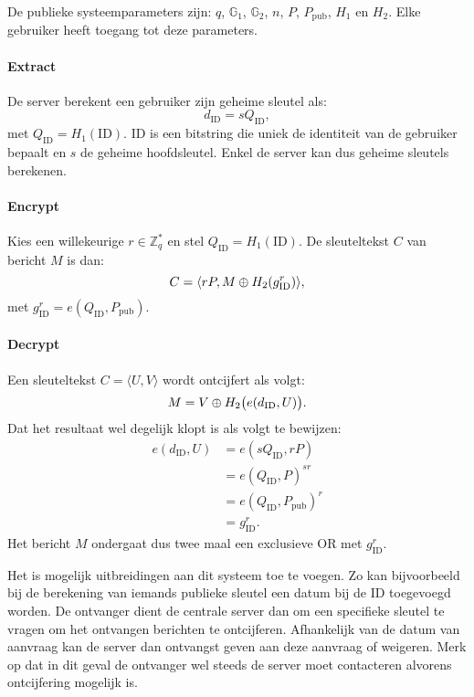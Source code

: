De publieke systeemparameters zijn: $q$, $\mathbb{G}_1$, $\mathbb{G}_2$, $n$, $P$, $P_{\text{pub}}$, $H_1$ en $H_2$. Elke gebruiker heeft toegang tot deze parameters.

\paragraph{Extract} De server berekent een gebruiker zijn geheime sleutel als:
\[d_{\text{ID}} = s Q_{\text{ID}},\]
met $Q_{\text{ID}} = H_1(\text{ID})$. ID is een bitstring die uniek de identiteit van de gebruiker bepaalt en $s$ de geheime hoofdsleutel. Enkel de server kan dus geheime sleutels berekenen.

\paragraph{Encrypt} Kies een willekeurige $r \in \mathbb{Z}_q^*$ en stel $Q_{\text{ID}} = H_1(\text{ID})$. De sleuteltekst $C$ van bericht $M$ is dan:
\[C = \langle rP, M \oplus H_2(g_{\text{ID}}^r) \rangle,\]
met $g_{\text{ID}}^r = e(Q_{\text{ID}}, P_{\text{pub}})$.

\paragraph{Decrypt} Een sleuteltekst $C = \langle U, V \rangle$ wordt ontcijfert als volgt:
\[M = V \oplus H_2\big( e(d_{\text{ID}}, U) \big).\]
Dat het resultaat wel degelijk klopt is als volgt te bewijzen:
\[\begin{aligned}
e(d_{\text{ID}}, U)	&= e(sQ_{\text{ID}}, rP)\\
							&= e(Q_{\text{ID}}, P)^{sr}\\
							&= e(Q_{\text{ID}}, P_{\text{pub}})^r\\
							&= g_{\text{ID}}^r.
\end{aligned}\]
Het bericht $M$ ondergaat dus twee maal een exclusieve OR met $g_{\text{ID}}^r$.

Het is mogelijk uitbreidingen aan dit systeem toe te voegen. Zo kan bijvoorbeeld bij de berekening van iemands publieke sleutel een datum bij de ID toegevoegd worden. De ontvanger dient de centrale server dan om een specifieke sleutel te vragen om het ontvangen berichten te ontcijferen. Afhankelijk van de datum van aanvraag kan de server dan ontvangst geven aan deze aanvraag of weigeren. Merk op dat in dit geval de ontvanger wel steeds de server moet contacteren alvorens ontcijfering mogelijk is.

